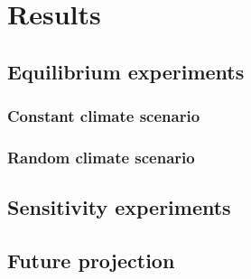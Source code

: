 \chapter{Results}\label{chap:results}
\thispagestyle{plain}

\section{Equilibrium experiments} %
\label{sec:equilibrium_experiments}
    
    \subsection{Constant climate scenario} %
    \label{sub:constant_climate_scenario}
    

    \subsection{Random climate scenario} %
    \label{sub:random_climate_scenario}
    


\section{Sensitivity experiments} %
\label{sec:sensitivity_experiments}


\section{Future projection} %
\label{sec:future_projection}

